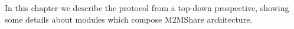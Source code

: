 In this chapter we describe the protocol from a top-down prospective, showing some details about modules which compose M2MShare architecture. 
%
%
%
%

